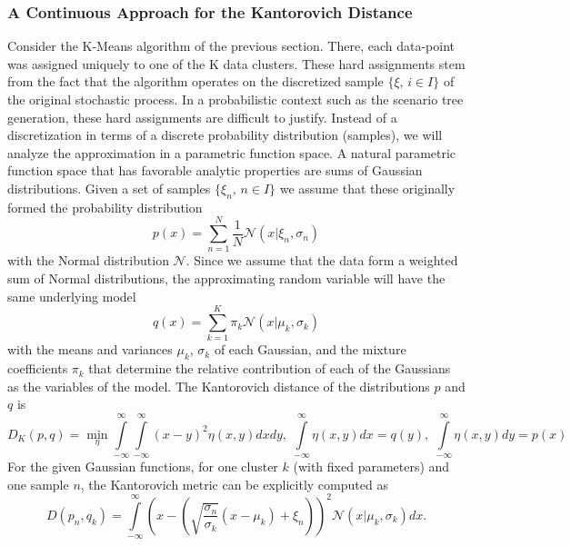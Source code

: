 \subsubsection{A Continuous Approach for the Kantorovich Distance}
\label{sec:cont-appr-kant}
Consider the K-Means algorithm of the previous section.
There, each data-point was assigned uniquely to one of the K data clusters.
These hard assignments stem from the fact that the algorithm operates on the discretized sample $\{\xi,\, i\in I\}$ of the original stochastic process.
In a probabilistic context such as the scenario tree generation, these hard assignments are difficult to justify.
Instead of a discretization in terms of a discrete probability distribution (samples), we will analyze the approximation in a parametric function space.
A natural parametric function space that has favorable analytic properties are sums of Gaussian distributions.
Given a set of samples $\{\xi_n,\, n\in I\}$ we assume that these originally formed the probability distribution
\begin{equation}
  \label{eq:31}
  p(x) = \sum_{n=1}^N\frac{1}{N}\mathcal{N}(x|\xi_n,\sigma_n)
\end{equation}
with the Normal distribution $\mathcal{N}$.
Since we assume that the data form a weighted sum of Normal distributions, the approximating random variable will have the same underlying model
\begin{equation}
  \label{eq:32}
  q(x) = \sum_{k=1}^K\pi_k\mathcal{N}(x|\mu_k, \sigma_k)
\end{equation}
with the means and variances $\mu_k$, $\sigma_k$ of each Gaussian, and the mixture coefficients $\pi_k$ that determine the relative contribution of each of the Gaussians as the variables of the model.
The Kantorovich distance of the distributions $p$ and $q$ is
\begin{equation}
  \label{eq:33}
  D_K(p,q) = \min\limits_{\eta}\int\limits_{-\infty}^{\infty}\int\limits_{-\infty}^{\infty}(x-y)^2\eta(x,y)dxdy,\; \int\limits_{-\infty}^{\infty}\eta(x,y)dx = q(y),\;\int\limits_{-\infty}^{\infty}\eta(x,y)dy = p(x)
\end{equation}
For the given Gaussian functions, for one cluster $k$ (with fixed parameters) and one sample $n$, the Kantorovich metric can be explicitly computed as
\begin{equation}
  \label{eq:34}
  D(p_n,q_k) = \int\limits_{-\infty}^{\infty}\left(x-\left(\sqrt{\frac{\sigma_n}{\sigma_k}}(x-\mu_k)+\xi_n\right)\right)^2\mathcal{N}(x|\mu_k,\sigma_k)dx.
\end{equation}
